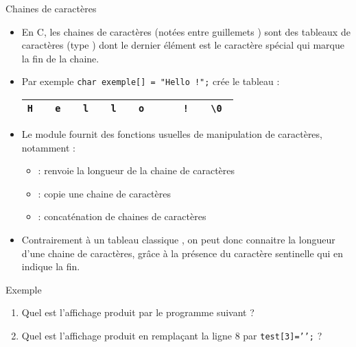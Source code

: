 \documentclass[10pt]{beamer}
\begin{document}
\begin{frame}[fragile]{\Ctitle}{\stitle}
	\begin{block}{Chaines de caractères}
		\begin{itemize}
			\item<1-> En C, les chaines de caractères (notées entre guillemets ) sont des tableaux de caractères (type ) dont le dernier élément est le caractère spécial  qui marque la fin de la chaine.
			\item<2-> Par exemple \texttt{char exemple[] = "Hello !";} crée le tableau :\\
				\begin{tabular}{|>{\tt}c|>{\tt}c|>{\tt}c|>{\tt}c|>{\tt}c|>{\tt}c|>{\tt}c|>{\tt}c|}
					\hline
					H & e & l & l & o & \; & ! & \textbackslash{}0 \\
					\hline
				\end{tabular}
			\item<3-> Le module  fournit des fonctions usuelles de manipulation de caractères, notamment :
				\begin{itemize}
					\item<4->  : renvoie la longueur de la chaine de caractères
					\item<5->  : copie une chaine de caractères
					\item<6->  : concaténation de chaines de caractères
				\end{itemize}
			\item<4-> Contrairement à un tableau \og{} classique \fg{}, on peut donc connaitre la longueur d'une chaine de caractères, grâce à la présence du caractère sentinelle  qui en indique la fin.
		\end{itemize}
	\end{block}
\end{frame}

\begin{frame}[fragile]{\Ctitle}{\stitle}
	\begin{exampleblock}{Exemple}
		\begin{enumerate}
		\item<1->Quel est l'affichage produit par le programme suivant ?
		\onslide<2->{\inputC{\SPATH/cours_ex10.c}{}{}}
		\item<2->Quel est l'affichage produit en remplaçant la ligne 8 par \texttt{test[3]='\0';} ?
	\end{enumerate}
	\end{exampleblock}
\end{frame}
\end{document}
